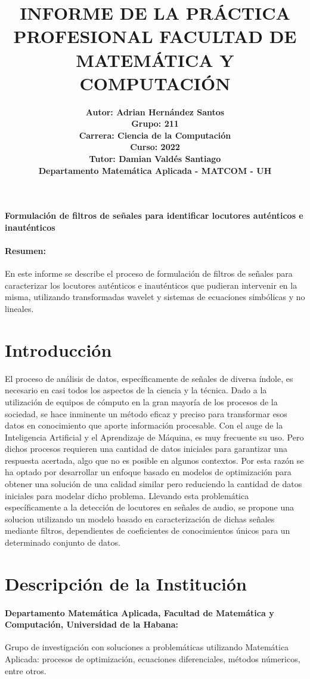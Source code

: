 \documentclass[11pt]{article}
\title{INFORME DE LA PRÁCTICA PROFESIONAL 
FACULTAD DE MATEMÁTICA Y COMPUTACIÓN}
\author{
    \bf {Autor: Adrian Hernández Santos}\\
    \bf {Grupo: 211}\\
    \bf {Carrera: Ciencia de la Computación}\\
    \bf {Curso: 2022}\\
    \bf {Tutor: Damian Valdés Santiago}\\
    \bf {Departamento Matemática Aplicada - MATCOM - UH}
}
\date{}
\begin{document}
\maketitle

\vfill
{
    \centering
    {
        \Large{\bf {Formulación de filtros de señales para identificar locutores auténticos e inauténticos}}
    }
}

\paragraph*{Resumen:} En este informe se describe el proceso de formulación de filtros de señales para caracterizar 
los locutores auténticos e inauténticos que pudieran intervenir en la misma, utilizando transformadas wavelet y 
sistemas de ecuaciones simbólicas y no lineales.

\clearpage

\section*{Introducción}
El proceso de análisis de datos, específicamente de señales de diversa índole, es necesario en casi todos los aspectos 
de la ciencia y la técnica. Dado a la utilización de equipos de cómputo en la gran mayoría de los procesos de la sociedad, 
se hace inminente un método eficaz y preciso para transformar esos datos en conocimiento que aporte información procesable.
Con el auge de la Inteligencia Artificial y el Aprendizaje de Máquina, es muy frecuente su uso. Pero dichos procesos requieren una cantidad 
de datos iniciales para garantizar una respuesta acertada, algo que no es posible en algunos contextos. Por esta razón 
se ha optado por desarrollar un enfoque basado en modelos de optimización para obtener una solución de una calidad similar 
pero reduciendo la cantidad de datos iniciales para modelar dicho problema. Llevando esta problemática específicamente 
a la detección de locutores en señales de audio, se propone una solucion utilizando un modelo basado en caracterización de 
dichas señales mediante filtros, dependientes de coeficientes de conocimientos únicos para un determinado conjunto de datos.

\clearpage

\section*{Descripción de la Institución}
\paragraph*{Departamento Matemática Aplicada, Facultad de Matemática y Computación, Universidad de la Habana:}
Grupo de investigación con soluciones a problemáticas utilizando Matemática Aplicada: procesos de optimización, ecuaciones diferenciales, métodos númericos, entre otros.
\end{document}
